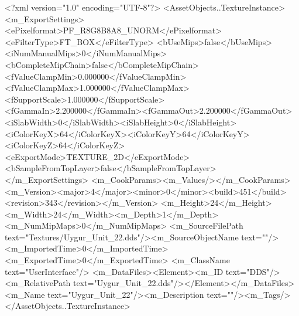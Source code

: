 <?xml version="1.0" encoding="UTF-8"?>
<AssetObjects..TextureInstance>
  <m_ExportSettings>
    <ePixelformat>PF_R8G8B8A8_UNORM</ePixelformat><eFilterType>FT_BOX</eFilterType>
    <bUseMips>false</bUseMips><iNumManualMips>0</iNumManualMips><bCompleteMipChain>false</bCompleteMipChain>
    <fValueClampMin>0.000000</fValueClampMin><fValueClampMax>1.000000</fValueClampMax><fSupportScale>1.000000</fSupportScale>
    <fGammaIn>2.200000</fGammaIn><fGammaOut>2.200000</fGammaOut><iSlabWidth>0</iSlabWidth><iSlabHeight>0</iSlabHeight>
    <iColorKeyX>64</iColorKeyX><iColorKeyY>64</iColorKeyY><iColorKeyZ>64</iColorKeyZ>
    <eExportMode>TEXTURE_2D</eExportMode><bSampleFromTopLayer>false</bSampleFromTopLayer>
  </m_ExportSettings>
  <m_CookParams><m_Values/></m_CookParams>
  <m_Version><major>4</major><minor>0</minor><build>451</build><revision>343</revision></m_Version>
  <m_Height>24</m_Height><m_Width>24</m_Width><m_Depth>1</m_Depth><m_NumMipMaps>0</m_NumMipMaps>
  <m_SourceFilePath text="Textures/Uygur_Unit_22.dds"/><m_SourceObjectName text=""/>
  <m_ImportedTime>0</m_ImportedTime><m_ExportedTime>0</m_ExportedTime>
  <m_ClassName text="UserInterface"/>
  <m_DataFiles><Element><m_ID text="DDS"/><m_RelativePath text="Uygur_Unit_22.dds"/></Element></m_DataFiles>
  <m_Name text="Uygur_Unit_22"/><m_Description text=""/><m_Tags/>
</AssetObjects..TextureInstance>
